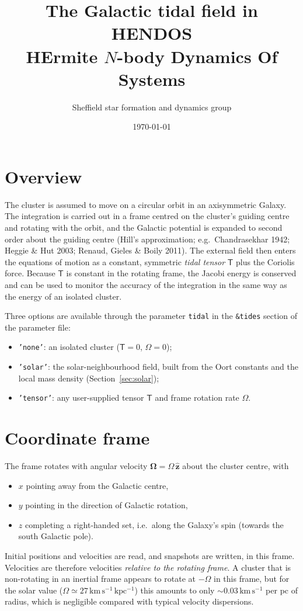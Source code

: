 \documentclass[11pt,a4paper]{article}
\title{The Galactic tidal field in HENDOS\\[4pt]
\large HErmite $N$-body Dynamics Of Systems}
\author{Sheffield star formation and dynamics group}
\date{\today}
\newcommand{\T}{\mathsf{T}}
\newcommand{\bO}{\boldsymbol{\Omega}}
\newcommand{\kmskpc}{\mathrm{km\,s^{-1}\,kpc^{-1}}}
\begin{document}
\maketitle

\section{Overview}

The cluster is assumed to move on a circular orbit in an axisymmetric
Galaxy. The integration is carried out in a frame centred on the
cluster's guiding centre and rotating with the orbit, and the Galactic
potential is expanded to second order about the guiding centre (Hill's
approximation; e.g.\ Chandrasekhar 1942; Heggie \& Hut 2003; Renaud,
Gieles \& Boily 2011). The external field then enters the equations of
motion as a constant, symmetric \emph{tidal tensor} $\T$ plus the
Coriolis force. Because $\T$ is constant in the rotating frame, the
Jacobi energy is conserved and can be used to monitor the accuracy of
the integration in the same way as the energy of an isolated cluster.

Three options are available through the parameter \texttt{tidal} in the
\texttt{\&tides} section of the parameter file:
\begin{itemize}
\item \texttt{'none'}: an isolated cluster ($\T=0$, $\Omega=0$);
\item \texttt{'solar'}: the solar-neighbourhood field, built from the
  Oort constants and the local mass density (Section~\ref{sec:solar});
\item \texttt{'tensor'}: any user-supplied tensor $\T$ and frame
  rotation rate $\Omega$.
\end{itemize}

\section{Coordinate frame}

The frame rotates with angular velocity $\bO = \Omega\,\hat{\mathbf z}$
about the cluster centre, with
\begin{itemize}
\item $x$ pointing away from the Galactic centre,
\item $y$ pointing in the direction of Galactic rotation,
\item $z$ completing a right-handed set, i.e.\ along the Galaxy's spin
  (towards the south Galactic pole).
\end{itemize}
Initial positions and velocities are read, and snapshots are written,
in this frame. Velocities are therefore velocities \emph{relative to
the rotating frame}. A cluster that is non-rotating in an inertial frame
appears to rotate at $-\Omega$ in this frame, but for the solar value
($\Omega \simeq 27\,\kmskpc$) this amounts to only
$\sim 0.03\,\mathrm{km\,s^{-1}}$ per pc of radius, which is negligible
compared with typical velocity dispersions.
\end{document}
